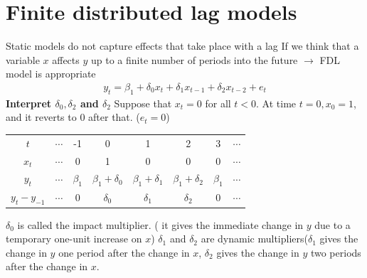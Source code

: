\documentclass[a4paper,twoside,11pt]{article}
\begin{document}
\section{Finite distributed lag models}
\noindent Static models do not capture effects that take place with a lag
\newline
\textcolor{NavyBlue}{If we think that a variable $x$ affects $y$ up to a finite number of periods into the future} $\rightarrow$ FDL model is appropriate
\begin{equation*}
\begin{aligned}
    y_t = \beta_1 + \delta_0 x_t + \delta_1 x_{t-1} + \delta_2 x_{t-2} + e_t
\end{aligned}
\end{equation*}
\textbf{\textcolor{NavyBlue}{Interpret $\delta_0,\delta_2$ and $\delta_2$}}
\noindent Suppose that $x_t=0$ for all $t<0$. At time $t=0,  x_0 =1$, and it reverts to $0$ after that. ($e_t=0$)
\begin{center}
\begin{tabular}{ c c c c c c c c } 
 \hline
 $t$ & $\cdots$ & -1 & 0 & 1 & 2 & 3 & $\cdots$ \\
 $x_t$ & $\cdots$ & 0 & 1 & 0 & 0 & 0 & $\cdots$ \\ 
 $y_t$ & $\cdots$ & $\beta_1$ & $\beta_1 + \delta_0$ & $\beta_1 + \delta_1$ & $\beta_1 + \delta_2$ & $\beta_1$ & $\cdots$ \\
 $y_t - y_{-1}$ & $\cdots$ & 0 & $\delta_0$ & $\delta_1$ & $\delta_2$ & 0 & $\cdots$\\
 \hline
\end{tabular}
\end{center}
\textcolor{NavyBlue}{$\delta_0$} is called the impact multiplier. ( it gives the immediate change in $y$ due to a temporary one-unit increase on $x$)
\newline
\textcolor{NavyBlue}{$\delta_1$ and $\delta_2$} are dynamic multipliers($\delta_1$ gives the change in $y$ one period after the change in $x$, $\delta_2$ gives the change in $y$ two periods after the change in $x$. 
\end{document}
